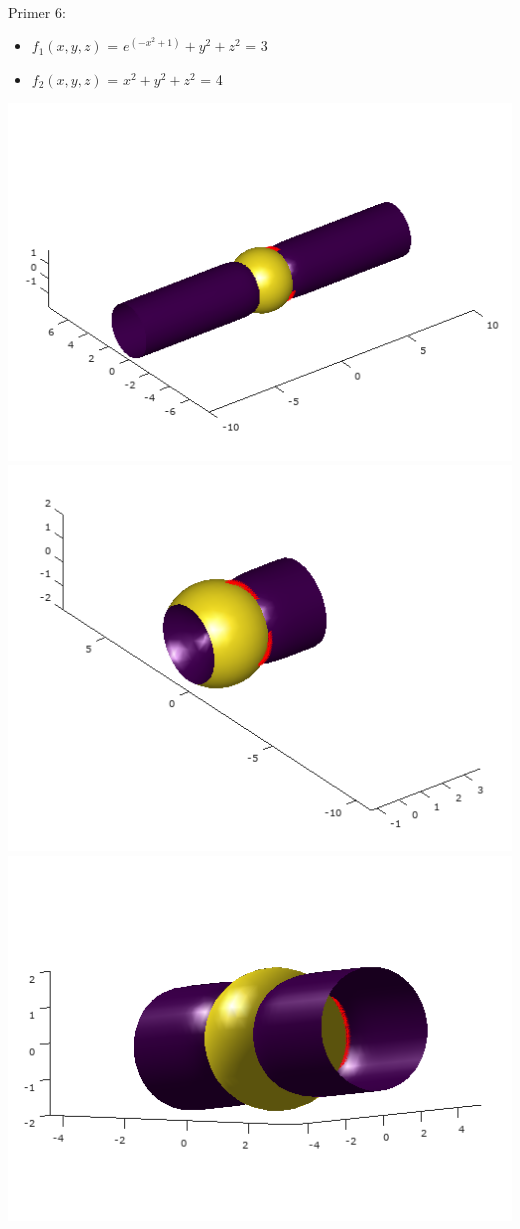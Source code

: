\documentclass[]{article}
\begin{document}
	\\
	Primer 6:
	\begin{itemize}  
		\item $f_{1}(x,y,z)$ = $e^{(-x^{2}+1)}+y^{2}+z^{2}$ = 3
		\item $f_{2}(x,y,z)$ = $x^2 + y^2 + z^2$ = 4
	\end{itemize}
	\includegraphics[scale=0.5]{primer6_1}
	\includegraphics[scale=0.5]{primer6_2}
	\includegraphics[scale=0.5]{primer6_3}
\end{document}
